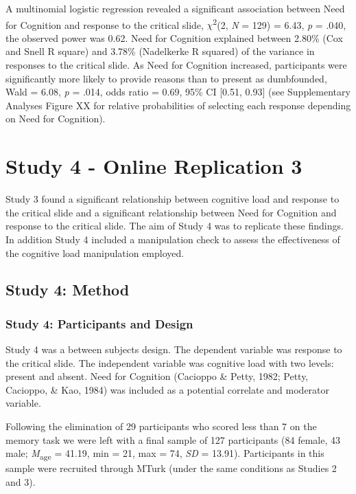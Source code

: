 \documentclass[
  american,
  man,floatsintext]{apa7}
\begin{document}
A multinomial logistic regression revealed a significant association between Need for Cognition and response to the critical slide, \(\chi\)\textsuperscript{2}(2, \emph{N} = 129) = 6.43, \emph{p} = .040, the observed power was 0.62. Need for Cognition explained between 2.80\% (Cox and Snell R square) and 3.78\% (Nadelkerke R squared) of the variance in responses to the critical slide. As Need for Cognition increased, participants were significantly more likely to provide reasons than to present as dumbfounded, Wald = 6.08, \emph{p} = .014, odds ratio = 0.69, 95\% CI {[}0.51, 0.93{]} (see Supplementary Analyses Figure XX for relative probabilities of selecting each response depending on Need for Cognition).

\hypertarget{study-4---online-replication-3}{%
\section{Study 4 - Online Replication 3}\label{study-4---online-replication-3}}

Study 3 found a significant relationship between cognitive load and response to the critical slide and a significant relationship between Need for Cognition and response to the critical slide. The aim of Study 4 was to replicate these findings. In addition Study 4 included a manipulation check to assess the effectiveness of the cognitive load manipulation employed.

\hypertarget{study-4-method}{%
\subsection{Study 4: Method}\label{study-4-method}}

\hypertarget{study-4-participants-and-design}{%
\subsubsection{Study 4: Participants and Design}\label{study-4-participants-and-design}}

Study 4 was a between subjects design. The dependent variable was response to the critical slide. The independent variable was cognitive load with two levels: present and absent. Need for Cognition (Cacioppo \& Petty, 1982; Petty, Cacioppo, \& Kao, 1984) was included as a potential correlate and moderator variable.

Following the elimination of 29 participants who scored less than 7 on the memory task we were left with a final sample of 127 participants (84 female, 43 male; \emph{M}\textsubscript{age} = 41.19, min = 21, max = 74, \emph{SD} = 13.91). Participants in this sample were recruited through
MTurk (under the same conditions as Studies 2 and 3).
\end{document}
